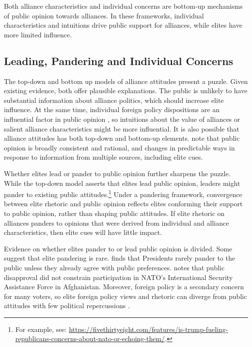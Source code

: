 \documentclass[12pt]{article}
\begin{document}
Both alliance characteristics and individual concerns are bottom-up mechanisms of public opinion towards alliances. 
In these frameworks, individual characteristics and intuitions drive public support for alliances, while elites have more limited influence. 
 


\subsection{Leading, Pandering and Individual Concerns}


The top-down and bottom up models of alliance attitudes present a puzzle. 
Given existing evidence, both offer plausible explanations. 
The public is unlikely to have substantial information about alliance politics, which should increase elite influence. 
At the same time, individual foreign policy dispositions are an influential factor in public opinion \citep{Herrmannetal2009, KertzerZeitzoff2017}, so intuitions about the value of alliances or salient alliance characteristics might be more influential. 
It is also possible that alliance attitudes has both top-down and bottom-up elements. 
\citet{PageShapiro1992} note that public opinion is broadly consistent and rational, and changes in predictable ways in response to information from multiple sources, including elite cues. 



Whether elites lead or pander to public opinion further sharpens the puzzle. 
While the top-down model asserts that elites lead public opinion, leaders might pander to existing public attitudes.\footnote{For example, see: \url{https://fivethirtyeight.com/features/is-trump-fueling-republicans-concerns-about-nato-or-echoing-them/}.}
Under a pandering framework, convergence between elite rhetoric and public opinion reflects elites conforming their support to public opinion, rather than shaping public attitudes. 
If elite rhetoric on alliances panders to opinions that were derived from individual and alliance characteristics, then elite cues will have little impact.


Evidence on whether elites pander to or lead public opinion is divided.
Some suggest that elite pandering is rare. 
\citet{Canes-Wrone2006} finds that Presidents rarely pander to the public unless they already agree with public preferences.
\citet{Kreps2010} notes that public disapproval did not constrain participation in NATO's International Security Assistance Force in Afghanistan. 
Moreover, foreign policy is a secondary concern for many voters, so elite foreign policy views and rhetoric can diverge from public attitudes with few political repercussions \citep{BusbyMonten2012}. 
\end{document}
